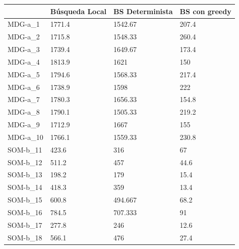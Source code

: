 \documentclass[11pt,a4paper]{article}
\begin{document}
	\begin{table}[H]
		\begin{tabular}{l|l|l|l|}
			\cline{2-4}
			& Búsqueda Local & BS Determinista & BS con greedy \\ \hline
			\multicolumn{1}{|l|}{MDG-a\_1}  & 1771.4         & 1542.67         & 207.4         \\ \hline
			\multicolumn{1}{|l|}{MDG-a\_2}  & 1715.8         & 1548.33         & 260.4         \\ \hline
			\multicolumn{1}{|l|}{MDG-a\_3}  & 1739.4         & 1649.67         & 173.4         \\ \hline
			\multicolumn{1}{|l|}{MDG-a\_4}  & 1813.9         & 1621            & 150           \\ \hline
			\multicolumn{1}{|l|}{MDG-a\_5}  & 1794.6         & 1568.33         & 217.4         \\ \hline
			\multicolumn{1}{|l|}{MDG-a\_6}  & 1738.9         & 1598            & 222           \\ \hline
			\multicolumn{1}{|l|}{MDG-a\_7}  & 1780.3         & 1656.33         & 154.8         \\ \hline
			\multicolumn{1}{|l|}{MDG-a\_8}  & 1790.1         & 1505.33         & 219.2         \\ \hline
			\multicolumn{1}{|l|}{MDG-a\_9}  & 1712.9         & 1667            & 155           \\ \hline
			\multicolumn{1}{|l|}{MDG-a\_10} & 1766.1         & 1559.33         & 230.8         \\ \hline
			\multicolumn{1}{|l|}{SOM-b\_11} & 423.6          & 316             & 67            \\ \hline
			\multicolumn{1}{|l|}{SOM-b\_12} & 511.2          & 457             & 44.6          \\ \hline
			\multicolumn{1}{|l|}{SOM-b\_13} & 198.2          & 179             & 15.4          \\ \hline
			\multicolumn{1}{|l|}{SOM-b\_14} & 418.3          & 359             & 13.4          \\ \hline
			\multicolumn{1}{|l|}{SOM-b\_15} & 600.8          & 494.667         & 68.2          \\ \hline
			\multicolumn{1}{|l|}{SOM-b\_16} & 784.5          & 707.333         & 91            \\ \hline
			\multicolumn{1}{|l|}{SOM-b\_17} & 277.8          & 246             & 12.6          \\ \hline
			\multicolumn{1}{|l|}{SOM-b\_18} & 566.1          & 476             & 27.4          \\ \hline

\end{tabular}
\end{table}
\end{document}
